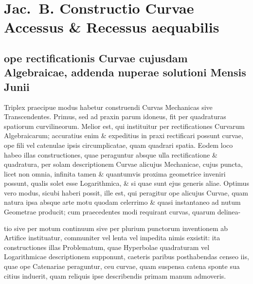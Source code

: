 \documentclass{article}
\begin{document}
\section*{Jac.\ B. Constructio Curvae Accessus \& Recessus aequabilis}
\subsection*{ope rectificationis Curvae cujusdam Algebraicae, addenda nuperae solutioni Mensis Junii}

Triplex praecipue modus habetur construendi Curvas Mechanicas sive Transcendentes. Primus, sed ad
praxin parum idoneus, fit per quadraturas spatiorum curvilineorum. Melior est, qui instituitur per
rectificationes Curvarum Algebraicarum; accuratius enim \& expeditius in praxi rectificari possunt
curvae, ope fili vel catenulae ipsis circumplicatae, quam quadrari spatia. Eodem loco habeo illas
constructiones, quae peraguntur absque ulla rectificatione \& quadratura, per solam descriptionem
Curvae alicujus Mechanicae, cujus puncta, licet non omnia, infinita tamen \& quantumvis proxima
geometrice inveniri possunt, qualis solet esse Logarithmica, \& si quae sunt ejus generis aliae.
Optimus vero modus, sicubi haberi possit, ille est, qui peragitur ope alicujus Curvae, quam natura
ipsa absque arte motu quodam celerrimo \& quasi instantaneo ad nutum Geometrae producit; cum
praecedentes modi requirant curvas, quarum delinea-

tio sive per motum continuum sive per plurium punctorum inventionem ab Artifice instituatur,
communiter vel lenta vel impedita nimis exsistit: ita constructiones illas Problematum, quae
Hyperbolae quadraturam vel Logarithmicae descriptionem supponunt, caeteris paribus posthabendas
censeo iis, quae ope Catenariae peraguntur, ceu curvae, quam suspensa catena sponte sua citius
induerit, quam reliquis ipse describendis primam manum admoveris.
\end{document}
